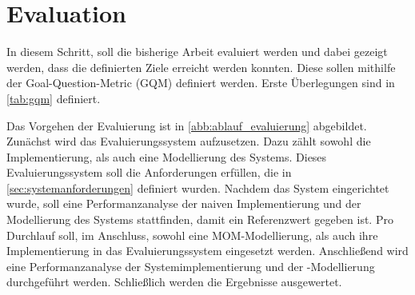 
\chapter{Evaluation}
\label{ch:Evaluation}
In diesem Schritt, soll die bisherige Arbeit evaluiert werden und dabei gezeigt werden, dass die definierten Ziele erreicht werden konnten. Diese sollen mithilfe der Goal-Question-Metric (GQM) definiert werden. Erste Überlegungen sind in \autoref{tab:gqm} definiert.\par
Das Vorgehen der Evaluierung ist in \autoref{abb:ablauf_evaluierung} abgebildet. Zunächst wird das Evaluierungssystem aufzusetzen. Dazu zählt sowohl die Implementierung, als auch eine Modellierung des Systems. Dieses Evaluierungssystem soll die Anforderungen erfüllen, die in \autoref{sec:systemanforderungen} definiert wurden. Nachdem das System eingerichtet wurde, soll eine Performanzanalyse der naiven Implementierung und der Modellierung des Systems stattfinden, damit ein Referenzwert gegeben ist. Pro Durchlauf soll, im Anschluss, sowohl eine MOM-Modellierung, als auch ihre Implementierung in das Evaluierungssystem eingesetzt werden. Anschließend wird eine Performanzanalyse der Systemimplementierung und der -Modellierung durchgeführt werden. Schließlich werden die Ergebnisse ausgewertet.
